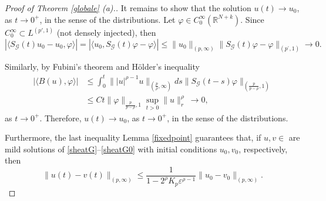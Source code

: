 \documentclass[12pt]{amsart}
\newcommand{\R}{\mathbb{R}}
\begin{document}
\begin{proof}[Proof of Theorem \ref{globale} (a).]
	
	It remains to show that the solution $u(t)\rightarrow u_0$, as $t\rightarrow 0^+$, in the sense of the distributions. Let $\varphi\in C^\infty_0(\R^{N+k})$. Since $C^\infty_0 \subset L^{(p',1)}$ (not densely injected), then
	\begin{equation*}
		|\langle S_\mathcal{G}(t)u_0-u_0,\varphi\rangle| =|\langle u_0,S_\mathcal{G}(t)\varphi-\varphi\rangle|
		\leq \|u_0\|_{(p,\infty)}\|S_\mathcal{G}(t)\varphi-\varphi\|_{(p^{\prime},1)}\rightarrow 0 .
	\end{equation*}
	
	
	Similarly, by Fubini's theorem and Hölder's inequality 
	\begin{equation*}
		\begin{aligned}
			|\langle B(u),\varphi\rangle| & \leq \int^t_0 \||u|^{\rho-1}u\|_{(\frac{p}{\rho},\infty)}ds\| S_\mathcal{G}(t-s)\varphi\|_{(\frac{p}{p-\rho},1)}\\
			& \leq C t  \|\varphi\|_{\frac{p}{p-\rho},1} \sup_{t>0} \|u\|_r^{\rho}\
			\rightarrow 0,
		\end{aligned}
	\end{equation*}
	as $t\rightarrow 0^+$. Therefore, $u(t)\rightarrow u_0$, as $t\rightarrow 0^+$, in the sense of the distributions.
	
	Furthermore, the last inequality Lemma \ref{fixedpoint} guarantees that, if $u,v\in$ are mild solutions of \eqref{sheatG}--\eqref{sheatG0} with initial conditions $u_0, v_0$, respectively, then 
	\begin{equation*}
		\|u(t) - v(t)\|_{(p,\infty)} \leq \frac{1}{1-2^\rho K_p \varepsilon^{\rho-1}} \|u_0 - v_0\|_{(p,\infty)} .
	\end{equation*}
\end{proof}
\end{document}
